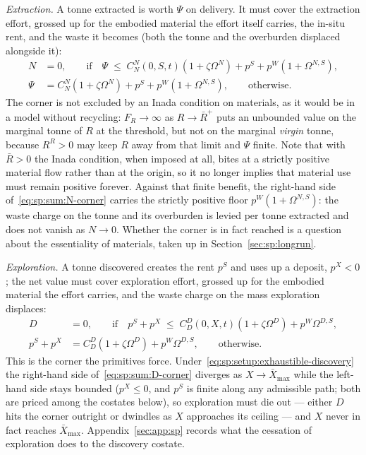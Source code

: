 \emph{Extraction.} A tonne extracted is worth $\Psi$ on delivery. It must cover the extraction
effort, grossed up for the embodied material the effort itself carries, the in-situ rent, and the
waste it becomes (both the tonne and the overburden displaced alongside it):
\begin{subequations}
\label{eq:sp:sum:Nsys}
\begin{align}
N &= 0,
\qquad \text{if}\quad
\Psi \;\le\; C^N_N\left(0,S,t\right)\left(1+\zeta\Omega^N\right)+p^S+p^W\left(1+\Omega^{N,S}\right),
\label{eq:sp:sum:N-corner}
\\
\Psi &= C^N_N\left(1+\zeta\Omega^N\right)+p^S+p^W\left(1+\Omega^{N,S}\right),
\qquad \text{otherwise.}
\label{eq:sp:sum:N}
\end{align}
\end{subequations}
The corner is not excluded by an Inada condition on materials, as it would be in a model without
recycling: $F_R\to\infty$ as $R\to\bar R^{+}$ puts an unbounded value on the marginal tonne of $R$
at the threshold, but not on the marginal \emph{virgin} tonne, because $R^R>0$ may keep $R$ away
from that limit and $\Psi$ finite. Note that with $\bar R>0$ the Inada condition, when imposed at
all, bites at a strictly positive material flow rather than at the origin, so it no longer implies
that material use must remain positive forever.
Against that finite benefit, the right-hand side of~\eqref{eq:sp:sum:N-corner} carries the strictly
positive floor $p^W\left(1+\Omega^{N,S}\right)$: the waste charge on the tonne and its overburden is
levied per tonne extracted and does not vanish as $N\to0$. Whether the corner is in fact reached is
a question about the essentiality of materials, taken up in Section~\ref{sec:sp:longrun}.

\emph{Exploration.} A tonne discovered creates the rent $p^S$ and uses up a deposit, $p^X<0$; the
net value must cover exploration effort, grossed up for the embodied material the effort carries,
and the waste charge on the mass exploration displaces:
\begin{subequations}
\label{eq:sp:sum:Dsys}
\begin{align}
D &= 0,
\qquad \text{if}\quad
p^S+p^X \;\le\; C^D_D\left(0,X,t\right)\left(1+\zeta\Omega^D\right)+p^W\Omega^{D,S},
\label{eq:sp:sum:D-corner}
\\
p^S+p^X &= C^D_D\left(1+\zeta\Omega^D\right)+p^W\Omega^{D,S},
\qquad \text{otherwise.}
\label{eq:sp:sum:D}
\end{align}
\end{subequations}
This is the corner the primitives force. Under~\eqref{eq:sp:setup:exhaustible-discovery} the
right-hand side of~\eqref{eq:sp:sum:D-corner} diverges as $X\to\bar X_{\max}$ while the left-hand
side stays bounded ($p^X\le0$, and $p^S$ is finite along any admissible path; both are priced among
the costates below), so exploration must die out --- either $D$ hits the corner outright or dwindles
as $X$ approaches its ceiling --- and $X$ never in fact reaches $\bar X_{\max}$.
Appendix~\ref{sec:app:sp} records what the cessation of exploration does to the discovery costate.

